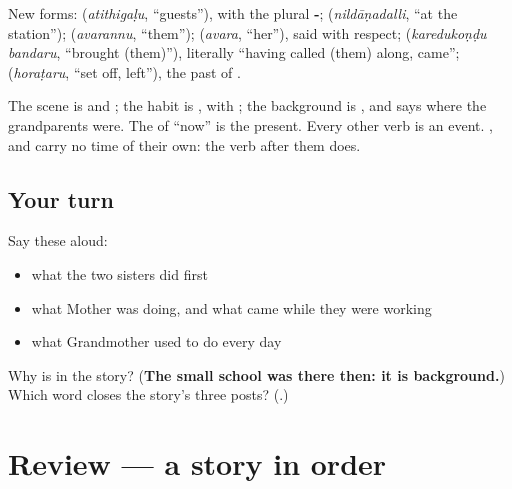 \begin{culture}
New forms: \textbf{} (\emph{atithigaḷu}, \textquotedblleft{}guests\textquotedblright{}), \textbf{} with the plural \textbf{-}; \textbf{} (\emph{nildāṇadalli}, \textquotedblleft{}at the station\textquotedblright{}); \textbf{} (\emph{avarannu}, \textquotedblleft{}them\textquotedblright{}); \textbf{} (\emph{avara}, \textquotedblleft{}her\textquotedblright{}), said with respect; \textbf{ } (\emph{karedukoṇḍu bandaru}, \textquotedblleft{}brought (them)\textquotedblright{}), literally \textquotedblleft{}having called (them) along, came\textquotedblright{}; \textbf{} (\emph{horaṭaru}, \textquotedblleft{}set off, left\textquotedblright{}), the past of \textbf{}.

The scene is \textbf{} and \textbf{ }; the habit is \textbf{}, with \textbf{}; the background is \textbf{}, and \textbf{} says where the grandparents were. The \textbf{} of \textquotedblleft{}now\textquotedblright{} is the present. Every other verb is an event. \textbf{}, \textbf{} and \textbf{} carry no time of their own: the verb after them does.
\end{culture}

\subsection*{Your turn}
Say these aloud:

\begin{itemize}
\raggedright
  \item what the two sisters did first
  \item what Mother was doing, and what came while they were working
  \item what Grandmother used to do every day
\end{itemize}

\begin{tcolorbox}[breakable,colback=teal!4,colframe=teal!35!black,title={Before you move on}]
Why is \textbf{} in the story? (\textbf{The small school was there then: it is background.}) Which word closes the story's three posts? (\textbf{}.)
\end{tcolorbox}
\section[(review)]{Review — a story in order}


